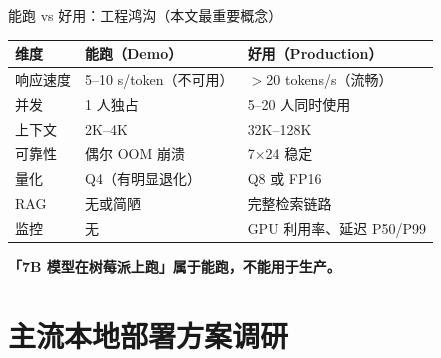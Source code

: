 \documentclass[UTF8,11pt,aspectratio=169]{beamer}
\begin{document}
\begin{frame}{能跑 vs 好用：工程鸿沟（本文最重要概念）}
  \begin{table}
    \centering
    \begin{tabular}{p{1.8cm}p{4cm}p{5cm}}
      \toprule
      \textbf{维度}   & \textbf{能跑（Demo）}                  & \textbf{好用（Production）} \\
      \midrule
      响应速度         & 5--10 s/token（不可用）               & $>$20 tokens/s（流畅）    \\
      并发             & 1 人独占                              & 5--20 人同时使用           \\
      上下文           & 2K--4K                                & 32K--128K                  \\
      可靠性           & 偶尔 OOM 崩溃                         & 7$\times$24 稳定           \\
      量化             & Q4（有明显退化）                      & Q8 或 FP16                 \\
      RAG              & 无或简陋                              & 完整检索链路               \\
      监控             & 无                                    & GPU 利用率、延迟 P50/P99   \\
      \bottomrule
    \end{tabular}
  \end{table}

  \begin{center}
    \textbf{「7B 模型在树莓派上跑」属于能跑，不能用于生产。}
  \end{center}
\end{frame}

\section{主流本地部署方案调研}
\end{document}
